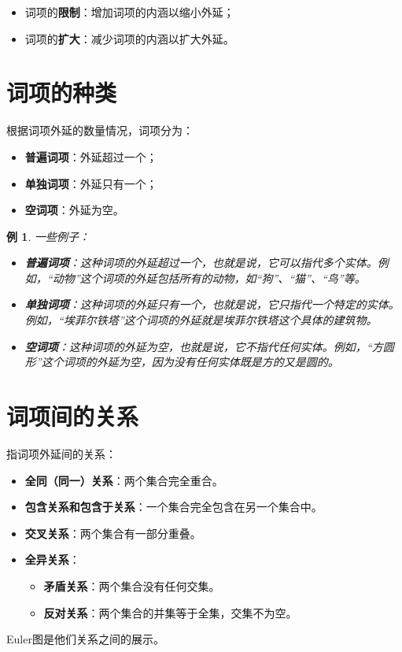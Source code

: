 \documentclass[12pt,onecolumn,a4paper]{book}
\newtheorem*{example}{例}
\numberwithin{table}{subsection}
\numberwithin{equation}{subsection}
\begin{document}
\begin{itemize}[itemsep=0pt,parsep=0pt]
    \item 词项的\textbf{限制}：增加词项的内涵以缩小外延；
    \item 词项的\textbf{扩大}：减少词项的内涵以扩大外延。
\end{itemize}

\section{词项的种类}

根据词项外延的数量情况，词项分为：
\begin{itemize}[itemsep=0pt,parsep=0pt]
    \item \textbf{普遍词项}：外延超过一个；
    \item \textbf{单独词项}：外延只有一个；
    \item \textbf{空词项}：外延为空。
\end{itemize}

\begin{example}
    一些例子：
    \begin{itemize}[itemsep=0pt,parsep=0pt]
        \item \textbf{普遍词项}：这种词项的外延超过一个，也就是说，它可以指代多个实体。例如，“动物”这个词项的外延包括所有的动物，如“狗”、“猫”、“鸟”等。
        \item \textbf{单独词项}：这种词项的外延只有一个，也就是说，它只指代一个特定的实体。例如，“埃菲尔铁塔”这个词项的外延就是埃菲尔铁塔这个具体的建筑物。
        \item \textbf{空词项}：这种词项的外延为空，也就是说，它不指代任何实体。例如，“方圆形”这个词项的外延为空，因为没有任何实体既是方的又是圆的。
    \end{itemize}
\end{example}

\section{词项间的关系}

指词项外延间的关系：
\begin{itemize}[itemsep=0pt,parsep=0pt]
    \item \textbf{全同（同一）关系}：两个集合完全重合。
    \item \textbf{包含关系和包含于关系}：一个集合完全包含在另一个集合中。
    \item \textbf{交叉关系}：两个集合有一部分重叠。
    \item \textbf{全异关系}：
    \begin{itemize}[itemsep=0pt,parsep=0pt]
        \item \textbf{矛盾关系}：两个集合没有任何交集。
        \item \textbf{反对关系}：两个集合的并集等于全集，交集不为空。
    \end{itemize}
\end{itemize}
Euler图是他们关系之间的展示。
\end{document}

